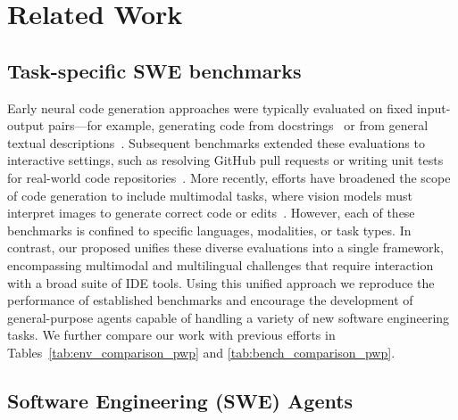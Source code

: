 
\section{Related Work}

\subsection{Task-specific SWE benchmarks}

Early neural code generation approaches were typically evaluated on fixed input-output pairs—for example, generating code from docstrings~\cite{chen2021evaluatinglargelanguagemodels} or from general textual descriptions~\cite{austin2021programsynthesislargelanguage}. 
Subsequent benchmarks extended these evaluations to interactive settings, such as resolving GitHub pull requests or writing unit tests for real-world code repositories~\cite{Jimenez2023SWEbenchCL, zan2024swebenchjavagithubissueresolving, mündler2025swtbenchtestingvalidatingrealworld}. 
More recently, efforts have broadened the scope of code generation to include multimodal tasks, where vision models must interpret images to generate correct code or edits~\cite{Si2024Design2CodeHF, Shi2024ChartMimicEL, jing2024dsbench, yang2024swebenchmultimodalaisystems}. However, each of these benchmarks is confined to specific languages, modalities, or task types. In contrast, our proposed \bench{} unifies these diverse evaluations into a single framework, encompassing multimodal and multilingual challenges that require interaction with a broad suite of IDE tools. Using this unified approach we reproduce the performance of established benchmarks and encourage the development of general-purpose agents capable of handling a variety of new software engineering tasks. We further compare our work with previous efforts in Tables~\ref{tab:env_comparison_pwp} and \ref{tab:bench_comparison_pwp}.


\subsection{Software Engineering (SWE) Agents}

